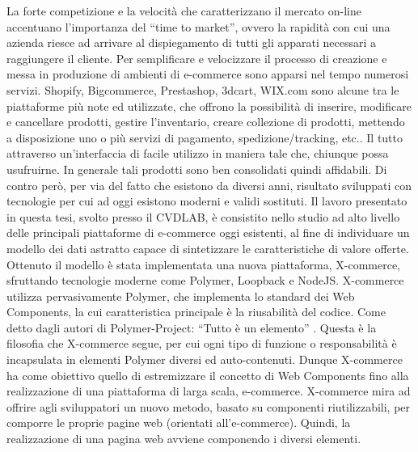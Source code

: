 \newline
La forte competizione e la velocità che caratterizzano il mercato on-line accentuano l’importanza del “time to market”, ovvero la rapidità con cui una azienda riesce ad arrivare al dispiegamento di tutti gli apparati necessari a raggiungere il cliente.
\newline
Per semplificare e velocizzare il processo di creazione e messa in produzione di ambienti di e-commerce sono apparsi nel tempo numerosi servizi.
\newline
Shopify, Bigcommerce, Prestashop, 3dcart, WIX.com sono alcune tra le piattaforme più note ed utilizzate, che offrono la possibilità di inserire, modificare e cancellare prodotti, gestire l’inventario, creare collezione di prodotti, mettendo a disposizione uno o più servizi di pagamento, spedizione/tracking, etc.. Il tutto attraverso un’interfaccia di facile utilizzo in maniera tale che, chiunque possa usufruirne.
\newline
In generale tali prodotti sono ben consolidati quindi affidabili. Di contro però, per via del fatto che esistono da diversi anni, risultato sviluppati con tecnologie per cui ad oggi esistono moderni e validi sostituti.
\newline
Il lavoro presentato in questa tesi, svolto presso il CVDLAB, è consistito nello studio ad alto livello delle principali piattaforme di e-commerce oggi esistenti, al fine di individuare un modello dei dati astratto capace di sintetizzare le caratteristiche di valore offerte.
Ottenuto il modello è stata implementata una nuova piattaforma, X-commerce, sfruttando
tecnologie moderne come Polymer, Loopback e NodeJS.
\newline
X-commerce utilizza pervasivamente Polymer, che implementa lo standard dei Web Components, la cui caratteristica principale è la riusabilità del codice.
Come detto dagli autori di Polymer-Project: “Tutto è un elemento” \cite{polymer_world_view}. Questa è la filosofia che X-commerce segue, per cui ogni tipo di funzione o responsabilità è incapsulata in elementi Polymer diversi ed auto-contenuti.
Dunque X-commerce ha come obiettivo  quello di estremizzare il concetto di Web Components fino alla realizzazione di una piattaforma di larga scala, e-commerce.
\newline
X-commerce mira ad offrire agli sviluppatori un nuovo metodo, basato su componenti riutilizzabili, per comporre le proprie pagine web (orientati all’e-commerce). Quindi, la realizzazione di una pagina web avviene componendo i diversi elementi.
\newline
